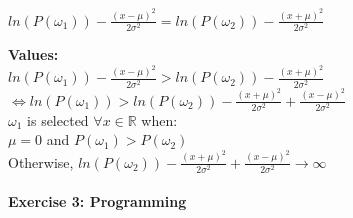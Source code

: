 \documentclass{article}
\begin{document}
\begin{description}
\begin{description}
$ln(P(\omega_1)) - \frac{(x-\mu)^2}{2\sigma^2} = ln(P(\omega_2)) - \frac{(x+\mu)^2}{2\sigma^2}$ 

\vspace{0.3cm} 

\item \textbf{Values:} \\

$ln(P(\omega_1)) - \frac{(x-\mu)^2}{2\sigma^2} > ln(P(\omega_2)) - \frac{(x+\mu)^2}{2\sigma^2}$ \\

$\Leftrightarrow ln(P(\omega_1)) > ln(P(\omega_2)) - \frac{(x+\mu)^2}{2\sigma^2} + \frac{(x-\mu)^2}{2\sigma^2}$ \\

$\omega_1$ is selected $\forall x \in \mathbb{R}$ when: \\

$\mu = 0$ and  $P(\omega_1) > P(\omega_2)$ \\

Otherwise, $ln(P(\omega_2)) - \frac{(x+\mu)^2}{2\sigma^2} + \frac{(x-\mu)^2}{2\sigma^2} \rightarrow \infty$

\end{description}

\end{description}

\paragraph{Exercise 3: Programming}
\end{document}
